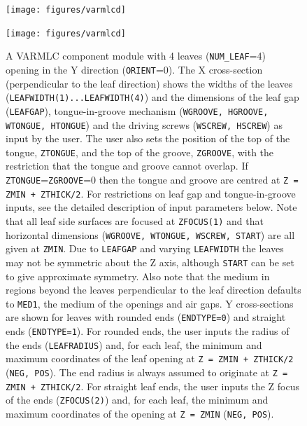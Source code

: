 \documentclass[12pt,twoside]{article}
\begin{document}
\newpage
\begin{figure}[tp]
\begin{center}
\leavevmode
\begin{latexonly}
\texttt{[image: figures/varmlcd]}
\end{latexonly}
\begin{htmlonly}
\texttt{[image: figures/varmlcd]}
\end{htmlonly}
\end{center}
\caption[VARMLC CM geometry]
{A VARMLC component module with 4 leaves ({\tt NUM\_LEAF}=4) opening in the Y
direction ({\tt ORIENT}=0).  The X cross-section (perpendicular to
the leaf direction) shows the widths of the leaves
({\tt LEAFWIDTH(1)...LEAFWIDTH(4)}) and the dimensions of
the leaf gap ({\tt LEAFGAP}), tongue-in-groove mechanism ({\tt WGROOVE, HGROOVE,
WTONGUE, HTONGUE}) and the driving screws ({\tt WSCREW, HSCREW}) as input by
the user.  The user also sets the position of the top of the tongue,
{\tt ZTONGUE},
and the top of the groove, {\tt ZGROOVE}, with the restriction that the tongue
and groove cannot overlap.  If {\tt ZTONGUE}={\tt ZGROOVE}=0 then
the tongue and groove are centred at {\tt Z = ZMIN + ZTHICK/2}.
For restrictions on leaf gap and tongue-in-groove inputs, see the detailed description
of input parameters below.
Note that all leaf side surfaces are focused at {\tt ZFOCUS(1)}
and that horizontal dimensions ({\tt WGROOVE, WTONGUE, WSCREW, START}) are all given
at {\tt ZMIN}.
Due to {\tt LEAFGAP} and varying {\tt LEAFWIDTH} the leaves may not be
symmetric about the Z axis, although {\tt START}
can be set to give approximate symmetry. Also note that the medium
in regions beyond the leaves perpendicular to the leaf direction defaults to {\tt MED1},
the medium of the openings and air gaps.  Y cross-sections are shown for leaves
with rounded ends ({\tt ENDTYPE=0}) and straight ends ({\tt ENDTYPE=1}).  For rounded
ends, the user inputs the radius of the ends ({\tt LEAFRADIUS}) and, for each leaf,
the minimum and maximum coordinates of the leaf opening at {\tt Z = ZMIN + ZTHICK/2}
({\tt NEG, POS}).  The end radius is always assumed to originate at
{\tt Z = ZMIN + ZTHICK/2}.  For straight leaf ends, the user inputs the Z focus of the
ends ({\tt ZFOCUS(2)}) and, for each leaf, the minimum and maximum coordinates of
the opening at {\tt Z = ZMIN} ({\tt NEG, POS}).}
\label{fig_VARMLCD}
\end{figure}

\end{document}
